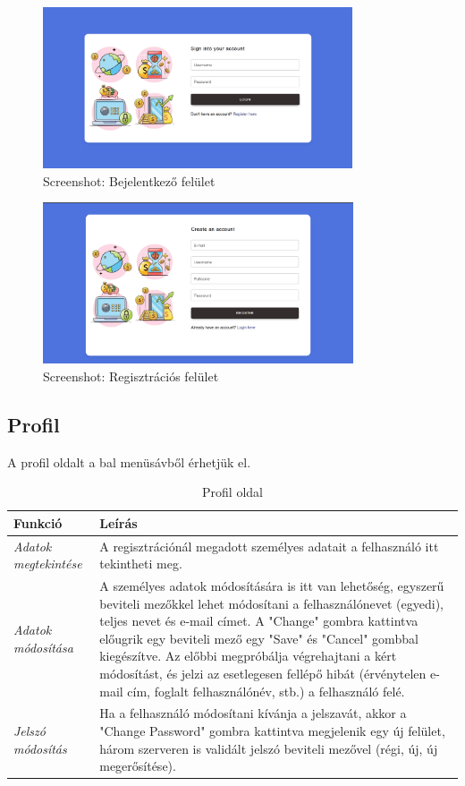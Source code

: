 \begin{figure}[H]
	\centering
	\includegraphics[height=180px]{img/login}
	\caption{Screenshot: Bejelentkező felület}
	\label{fig:login}
\end{figure}

\begin{figure}[H]
	\centering
	\includegraphics[height=180px]{img/register}
	\caption{Screenshot: Regisztrációs felület}
	\label{fig:register}
\end{figure}

\subsection{Profil}
A profil oldalt a bal menüsávből érhetjük el.
\begin{table}[H]
	\centering
	\begin{tabular}{ | m{} | m{} | }
		\hline
		\textbf{Funkció} & \textbf{Leírás} \\
		\hline \hline
		\emph{Adatok megtekintése} & A regisztrációnál megadott személyes adatait a felhasználó itt tekintheti meg. \\
		\hline
		\emph{Adatok módosítása} &  A személyes adatok módosítására is itt van lehetőség, egyszerű beviteli mezőkkel lehet módosítani a felhasználónevet (egyedi), teljes nevet és e-mail címet. A "Change" gombra kattintva előugrik egy beviteli mező egy "Save" és "Cancel" gombbal kiegészítve. Az előbbi megpróbálja végrehajtani a kért módosítást, és jelzi az esetlegesen fellépő hibát (érvénytelen e-mail cím, foglalt felhasználónév, stb.) a felhasználó felé.  \\
		\hline
		\emph{Jelszó módosítás} & Ha a felhasználó módosítani kívánja a jelszavát, akkor a "Change Password" gombra kattintva megjelenik egy új felület, három szerveren is validált jelszó beviteli mezővel (régi, új, új megerősítése). \\
		\hline
	\end{tabular}
	\caption{Profil oldal}
	\label{tab:profile}
\end{table}


